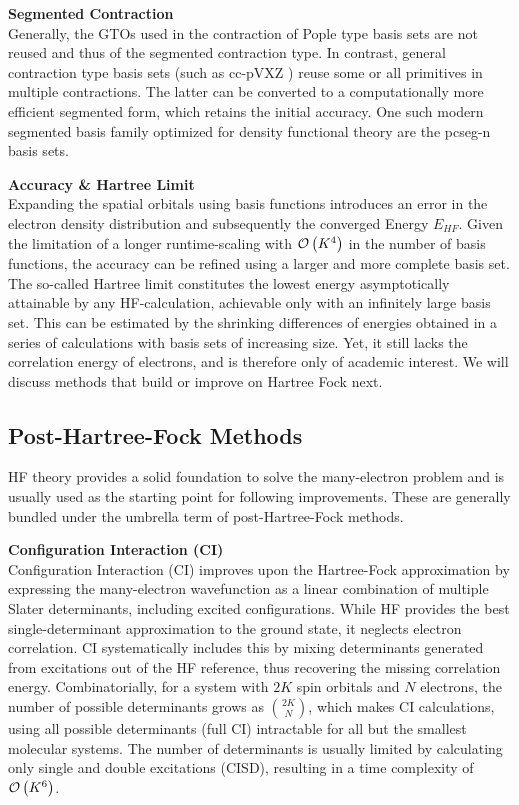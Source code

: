 \textbf{Segmented Contraction}\\
Generally, the GTOs used in the contraction of Pople type basis sets are not reused and thus of the segmented contraction type. In contrast, general contraction type basis sets (such as cc-pVXZ \parencite{ref:cc-pVXZ}) reuse some or all primitives in multiple contractions. The latter can be converted to a computationally more efficient segmented form, which retains the initial accuracy. One such modern segmented basis family optimized for density functional theory are the pcseg-n basis sets. \parencite{ref:Jensen2014pcs}

\textbf{Accuracy \& Hartree Limit}\\
Expanding the spatial orbitals using basis functions introduces an error in the electron density distribution and subsequently the converged Energy $E_{HF}$. Given the limitation of a longer runtime-scaling with $\mathcal{O}\left(K^4\right)$ in the number of basis functions, the accuracy can be refined using a larger and more complete basis set. The so-called Hartree limit constitutes the lowest energy asymptotically attainable by any HF-calculation, achievable only with an infinitely large basis set. This can be estimated by the shrinking differences of energies obtained in a series of calculations with basis sets of increasing size. \parencite{ref:Jensen2005hf} Yet, it still lacks the correlation energy of electrons, and is therefore only of academic interest. We will discuss methods that build or improve on Hartree Fock next. 
\newpage
\subsection{Post-Hartree-Fock Methods}
\label{subsec:background_post_hf}
HF theory provides a solid foundation to solve the many-electron problem and is usually used as the starting point for following improvements. These are generally bundled under the umbrella term of post-Hartree-Fock methods.

\textbf{Configuration Interaction (CI)}\\
Configuration Interaction (CI) improves upon the Hartree-Fock approximation by expressing the many-electron wavefunction as a linear combination of multiple Slater determinants, including excited configurations. While HF provides the best single-determinant approximation to the ground state, it neglects electron correlation. CI systematically includes this by mixing determinants generated from excitations out of the HF reference, thus recovering the missing correlation energy. Combinatorially, for a system with $2K$ spin orbitals and $N$ electrons, the number of possible determinants grows as $\binom{2K}{N}$, which makes CI calculations, using all possible determinants (full CI) intractable for all but the smallest molecular systems. The number of determinants is usually limited by calculating only single and double excitations (CISD), resulting in a time complexity of $\mathcal{O}\left(K^6\right)$.

